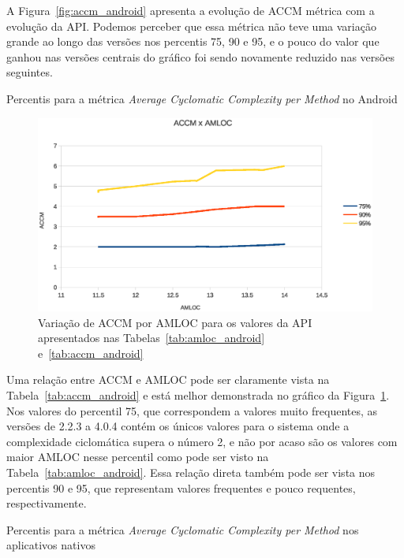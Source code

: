 A Figura~\ref{fig:accm_android} apresenta a evolução de ACCM métrica com a evolução da API. Podemos perceber que essa métrica não teve uma variação grande ao longo das versões nos percentis 75, 90 e 95, e o pouco do valor que ganhou nas versões centrais do gráfico foi sendo novamente reduzido nas versões seguintes.

\begin{table}[!htb]

\caption{Percentis para a métrica \textit{Average Cyclomatic Complexity per Method} no Android}
\label{tab:accm_android}
\end{table}

\begin{figure}[!htb]
\centering
\includegraphics [keepaspectratio=true,scale=0.85]{figuras/ACCMxAMLOC.eps}
\caption{Variação de ACCM por AMLOC para os valores da API apresentados nas Tabelas~\ref{tab:amloc_android} e~\ref{tab:accm_android}}
\label{fig:accmxamloc}
\end{figure}

Uma relação entre ACCM e AMLOC pode ser claramente vista na Tabela~\ref{tab:accm_android} e está melhor demonstrada no gráfico da Figura~\ref{fig:accmxamloc}. Nos valores do percentil 75, que correspondem a valores muito frequentes, as versões de 2.2.3 a 4.0.4 contém os únicos valores para o sistema onde a complexidade ciclomática supera o número 2, e não por acaso são os valores com maior AMLOC nesse percentil como pode ser visto na Tabela~\ref{tab:amloc_android}. Essa relação direta também pode ser vista nos percentis 90 e 95, que representam valores frequentes e pouco requentes, respectivamente.

\begin{table}[!htb]

\caption{Percentis para a métrica \textit{Average Cyclomatic Complexity per Method} nos aplicativos nativos}
\label{tab:accm_apps}
\end{table}

